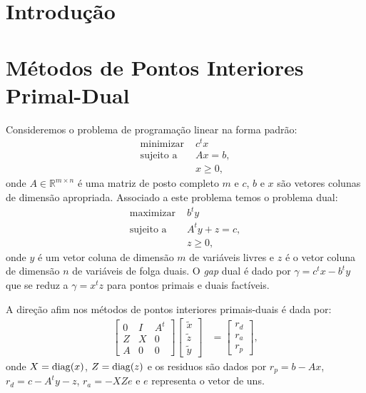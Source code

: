 % 
% 
% 

\section{Introdução}

\section{Métodos de Pontos Interiores Primal-Dual}
Consideremos o problema de programação linear na forma padrão:
\begin{align*}
    \text{minimizar } & c^t x \\
    \text{sujeito a } & A x = b, \\
    & x \geq 0,
\end{align*}
onde $A \in \mathbb{R}^{m \times n}$ é uma matriz de posto completo $m$ e $c$,
$b$ e $x$ são vetores colunas de dimensão apropriada. Associado a este problema
temos o problema dual:
\begin{align*}
    \text{maximizar } & b^t y \\
    \text{sujeito a } & A^t y + z = c, \\
    & z \geq 0,
\end{align*}
onde $y$ é um vetor coluna de dimensão $m$ de variáveis livres e $z$ é o vetor
coluna de dimensão $n$ de variáveis de folga duais. O \textit{gap} dual é dado
por $\gamma = c^t x - b^t y$ que se reduz a $\gamma = x^t z$ para pontos primais
e duais factíveis.

A direção afim nos métodos de pontos interiores primais-duais é dada por:
\begin{align}
    \begin{bmatrix}
         0 & I & A^t \\
         Z & X & 0 \\
         A & 0 & 0
     \end{bmatrix} \begin{bmatrix}
         \tilde{x} \\
         \tilde{z} \\
         \tilde{y}
     \end{bmatrix} &= \begin{bmatrix}
         r_d \\
         r_a \\
         r_p
     \end{bmatrix},
     \label{eq:primal_dual_intp:lin_system}
\end{align}
onde $X = \operatorname*{diag}(x)$, $Z = \operatorname*{diag}(z)$ e os residuos são dados por $r_p = b - A
x$, $r_d = c - A^t y - z$, $r_a = - X Z e$ e $e$ representa o vetor de uns.

